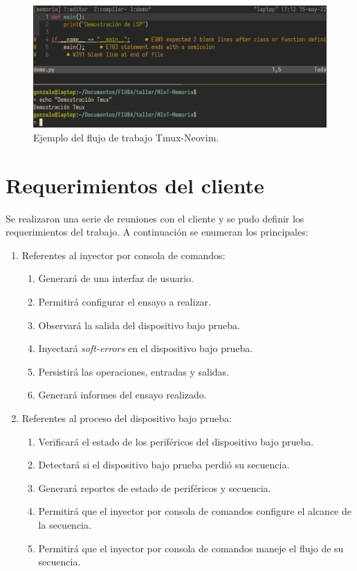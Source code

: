 \begin{figure}[htbp]
	\centering
	\includegraphics[width=\textwidth]{./Figures/nvimtmux.png}
    \caption{Ejemplo del flujo de trabajo Tmux-Neovim.}
	\label{fig:nvim}
\end{figure}

\newpage

\section{Requerimientos del cliente}
\label{sec:emphuerimientos}

Se realizaron una serie de reuniones con el cliente y se pudo definir los requerimientos del trabajo.
A continuación se enumeran los principales:

\begin{enumerate}
	\item Referentes al inyector por consola de comandos:
		\begin{enumerate}
			\item Generará de una interfaz de usuario.
			\item Permitirá configurar el ensayo a realizar.
			\item Observará la salida del dispositivo bajo prueba.
            \item Inyectará \emph{soft-errors} en el dispositivo bajo prueba.
			\item Persistirá las operaciones, entradas y salidas.
			\item Generará informes del ensayo realizado.
		\end{enumerate}
	\item Referentes al proceso del dispositivo bajo prueba:
		\begin{enumerate}
			\item Verificará el estado de los periféricos del dispositivo bajo prueba.
			\item Detectará si el dispositivo bajo prueba perdió su secuencia.
			\item Generará reportes de estado de periféricos y secuencia.
			\item Permitirá que el inyector por consola de comandos configure el alcance de la secuencia.
			\item Permitirá que el inyector por consola de comandos maneje el flujo de su secuencia.
		\end{enumerate}
\end{enumerate}

